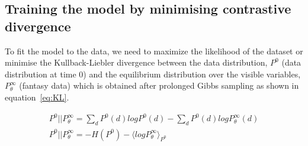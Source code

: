 \documentclass[conference]{IEEEtran}
\begin{document}
\subsection{Training the model by minimising contrastive divergence}

To fit the model to the data, we need to maximize the likelihood of the dataset or minimise the Kullback-Liebler divergence between the data distribution, $P^0$ (data distribution at time 0) and the equilibrium distribution over the visible variables, $P^\infty_\theta$ (fantasy data) which is obtained after prolonged Gibbs sampling as shown in equation~\ref{eq:KL}. 

\begin{eqnarray}
P^0 || P^\infty_\theta = \sum_{d}P^0 (d)logP^0(d) - \sum_{d}P^0 (d)logP^\infty_\theta(d) \label{eq:KL} \\
P^0 || P^\infty_\theta = -H(P^0) - \langle log P^\infty_\theta \rangle_{P^{0}}
\end{eqnarray}
\end{document}
